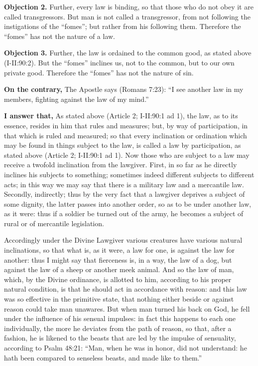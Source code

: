 \textbf{Objection 2.} Further, every law is binding, so that those who do not obey it are called transgressors. But man is not called a transgressor, from not following the instigations of the ``fomes''; but rather from his following them. Therefore the ``fomes'' has not the nature of a law.

\textbf{Objection 3.} Further, the law is ordained to the common good, as stated above (I-II:90:2). But the ``fomes'' inclines us, not to the common, but to our own private good. Therefore the ``fomes'' has not the nature of sin.

\textbf{On the contrary,} The Apostle says (Romans 7:23): ``I see another law in my members, fighting against the law of my mind.''

\textbf{I answer that,} As stated above (Article 2; I-II:90:1 ad 1), the law, as to its essence, resides in him that rules and measures; but, by way of participation, in that which is ruled and measured; so that every inclination or ordination which may be found in things subject to the law, is called a law by participation, as stated above (Article 2; I-II:90:1 ad 1). Now those who are subject to a law may receive a twofold inclination from the lawgiver. First, in so far as he directly inclines his subjects to something; sometimes indeed different subjects to different acts; in this way we may say that there is a military law and a mercantile law. Secondly, indirectly; thus by the very fact that a lawgiver deprives a subject of some dignity, the latter passes into another order, so as to be under another law, as it were: thus if a soldier be turned out of the army, he becomes a subject of rural or of mercantile legislation.

Accordingly under the Divine Lawgiver various creatures have various natural inclinations, so that what is, as it were, a law for one, is against the law for another: thus I might say that fierceness is, in a way, the law of a dog, but against the law of a sheep or another meek animal. And so the law of man, which, by the Divine ordinance, is allotted to him, according to his proper natural condition, is that he should act in accordance with reason: and this law was so effective in the primitive state, that nothing either beside or against reason could take man unawares. But when man turned his back on God, he fell under the influence of his sensual impulses: in fact this happens to each one individually, the more he deviates from the path of reason, so that, after a fashion, he is likened to the beasts that are led by the impulse of sensuality, according to Psalm 48:21: ``Man, when he was in honor, did not understand: he hath been compared to senseless beasts, and made like to them.''

